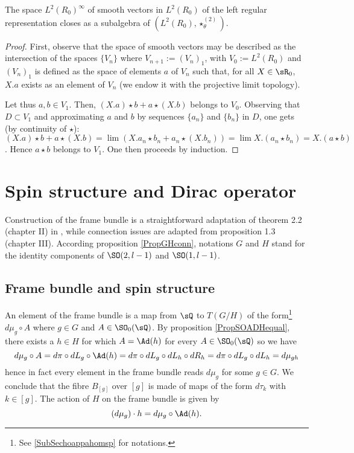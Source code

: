 \begin{proposition}
The space $L^2(R_0)^{\infty}$ of smooth vectors in $L^2(R_0)$ of the left regular representation closes as a subalgebra of $(L^2(R_0),\star^{(2)}_\theta)$.
\end{proposition}

\begin{proof}
First, observe that the space of smooth vectors may be described  as the intersection of the spaces $\{V_n\}$ where  $V_{n+1}:=(V_n)_1$,   with $V_0:=L^2(R_0)$ and $(V_n)_1$ is defined as the space of elements $a$ of $V_n$ such that, for all $X\in\sR_0$, $X.a$ exists as an element of $V_n$ (we endow it with the projective limit topology).                             %

Let thus $a,b\in V_1$. Then, $(X.a)\star b+a\star(X.b)$ belongs to $V_0$.  Observing that $D \subset V_1$ and approximating $a$ and $b$ by sequences $\{a_n\}$ and $\{b_n\}$ in $D $, one gets (by continuity of $\star$): $(X.a)\star b+a\star(X.b)=\lim(X.a_n\star b_n+a_n\star(X.b_n))= \lim X.(a_n\star b_n)=X.(a\star b)$. Hence $a\star b$ belongs to $V_1$.  One then proceeds by induction.
\end{proof}

\section{Spin structure and Dirac operator}	\label{SecDirADs}

Construction of the frame bundle is a straightforward adaptation of theorem 2.2 (chapter II) in \cite{AnnikFranc}, while connection issues are adapted from proposition 1.3 (chapter III).  According proposition \ref{PropGHconn}, notations $G$ and $H$ stand for the identity components of $\SO(2,l-1)$ and $\SO(1,l-1)$.

\subsection{Frame bundle and spin structure}

An element of the frame bundle is a map from $\sQ$ to $T(G/H)$ of the form\footnote{See \ref{SubSechoappahomsp} for notations.} $d\mu_g\circ A$ where $g\in G$ and $A\in \SO_0(\sQ)$. By proposition \ref{PropSOADHequal}, there exists a $h\in H$ for which $A=\Ad(h)$ for every $A\in\SO_0(\sQ)$ so we have
\[ 
 d\mu_g\circ A=d\pi\circ dL_g\circ\Ad(h)=d\pi\circ dL_g \circ dL_h\circ dR_h=d\pi\circ dL_g \circ dL_h=d\mu_{gh}
\]
hence in fact every element in the frame bundle reads $d\mu_g$ for some $g\in G$. We conclude that the fibre $B_{[g]}$ over $[g]$ is made of maps of the form $d\tau_k$ with $k\in[g]$. The action of $H$ on the frame bundle is given by 
\[ 
  (d\mu_g)\cdot h=d\mu_g\circ\Ad(h).
\]

